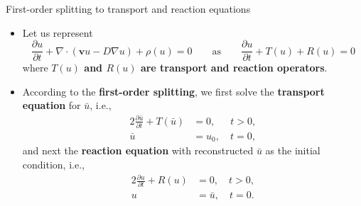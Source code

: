 %
%
\begin{frame}{First-order splitting to transport and reaction equations}
	\begin{itemize}
		\item Let us represent 
		\[\frac{\partial u}{\partial t}+\nabla\cdot(\boldsymbol{v}u-D\nabla u)  + \rho (u) = 0 \qquad \text{as} \qquad \frac{\partial u}{\partial t}+T(u) + R(u) = 0\] 
		where \alert{\bf $T(u)$ and $R(u)$ are transport and reaction operators}.\\[10pt]
		\pause
		\item According to the \alert{\bf first-order splitting}, we first solve the {\bf transport equation} for $\bar{u}$, i.e., 
		\begin{alignat*}{2}
		\frac{\partial \bar{u}}{\partial t}+T(\bar{u}) & = 0, \quad \;\: t > 0, \\[-5pt]
		\bar{u} &= u_0, \quad  t = 0, 
		\end{alignat*}
		and next the {\bf reaction equation} with reconstructed $\bar{u}$ as the initial condition, i.e.,  
		\begin{alignat*}{2}
			\frac{\partial u}{\partial t}+R(u) & = 0, \quad  t > 0, \\[-5pt]
			u & = \bar{u}, \quad  t = 0. 
		\end{alignat*}
	\end{itemize}
\end{frame}
%
%
